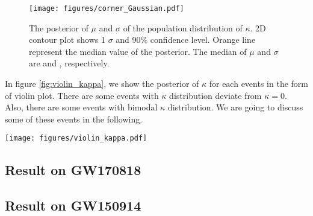 \documentclass[reprint,amsmath,amssymb,aps,twocolumn]{aastex631}
\begin{document}
\begin{figure}[h]
    \texttt{[image: figures/corner\_Gaussian.pdf]}
    \caption{
        The posterior of $\mu$ and $\sigma$ of the population distribution of $\kappa$.
        2D contour plot shows 1 $\sigma$ and 90\% confidence level.
        Orange line represent the median value of the posterior.
        The median of $\mu$ and $\sigma$ are  and , respectively.
    }
    \label{fig:corner_Gaussian}
\end{figure}


In figure \ref{fig:violin_kappa}, we show the posterior of $\kappa$ for each events in the form of violin plot.
There are some events with $\kappa$ distribution deviate from $\kappa=0$.
Also, there are some events with bimodal $\kappa$ distribution.
We are going to discuss some of these events in the following.
\begin{figure*}[ht]
    \texttt{[image: figures/violin\_kappa.pdf]}
    \caption{
        The violin plot shows the posterior of $\kappa$ for all 70 events included in this study.
        Each violin represents a different event.
        The violins are sorted by the quotient of median and standard deviation of the posterior.
        Blue horizontal line represent the median value of $\mu$, and blue region represent 1 $\sigma$ confidence level.
        Orange horizontal line represent $\kappa=0$.
        This plot shows that there are some events with $\kappa$ distribution significantly deviate from $0$.
    }
    \label{fig:violin_kappa}
\end{figure*}



\subsection{Result on GW170818}

\subsection{Result on GW150914}
\end{document}

